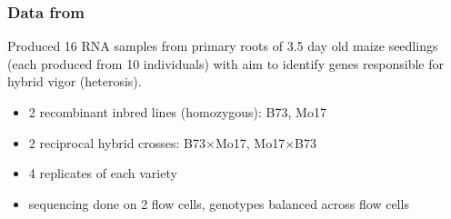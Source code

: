 \documentclass{beamer}
\begin{document}
\begin{frame}[label=current]
\frametitle{Data from \citet{paschold}}
Produced 16 RNA samples from primary roots of 3.5 day old maize seedlings (each produced from 10 individuals) with aim to identify genes responsible for hybrid vigor (heterosis).
\vspace{.5cm}
\pause\begin{beamerboxesrounded}[upper=upcol,lower=lowcol,shadow=true]{}
\begin{itemize}
\item 2 recombinant inbred lines (homozygous): B73, Mo17
\item 2 reciprocal hybrid crosses: B73$\times$Mo17, Mo17$\times$B73
\item 4 replicates of each variety
\item sequencing done on 2 flow cells, genotypes balanced across flow cells
\end{itemize}
\end{beamerboxesrounded}
\end{frame}
\end{document}
